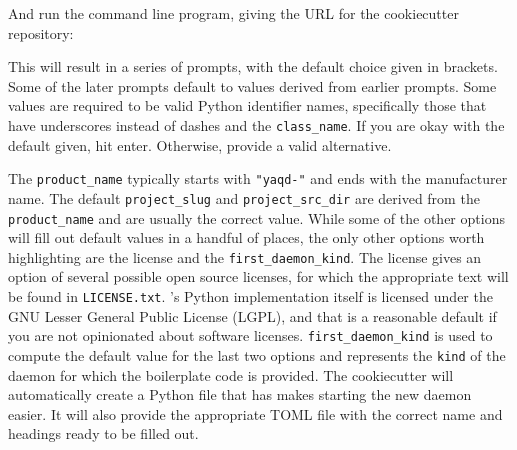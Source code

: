 And run the command line program, giving the URL for the cookiecutter repository:


This will result in a series of prompts, with the default choice given in brackets.
Some of the later prompts default to values derived from earlier prompts.
Some values are required to be valid Python identifier names, specifically those that have underscores instead of dashes and the \texttt{class\_name}.
If you are okay with the default given, hit enter.
Otherwise, provide a valid alternative.

The \texttt{product\_name} typically starts with \texttt{"yaqd-"} and ends with the manufacturer name.
The default \texttt{project\_slug} and \texttt{project\_src\_dir} are derived from the \texttt{product\_name} and are usually the correct value.
While some of the other options will fill out default values in a handful of places, the only other options worth highlighting are the license and the \texttt{first\_daemon\_kind}.
The license gives an option of several possible open source licenses, for which the appropriate text will be found in \texttt{LICENSE.txt}.
\yaq{}'s Python implementation itself is licensed under the GNU Lesser General Public License (LGPL), and that is a reasonable default if you are not opinionated about software licenses.
\texttt{first\_daemon\_kind} is used to compute the default value for the last two options and represents the \texttt{kind} of the daemon for which the boilerplate code is provided.
The cookiecutter will automatically create a Python file that has makes starting the new daemon easier.
It will also provide the appropriate TOML file with the correct name and headings ready to be filled out.

